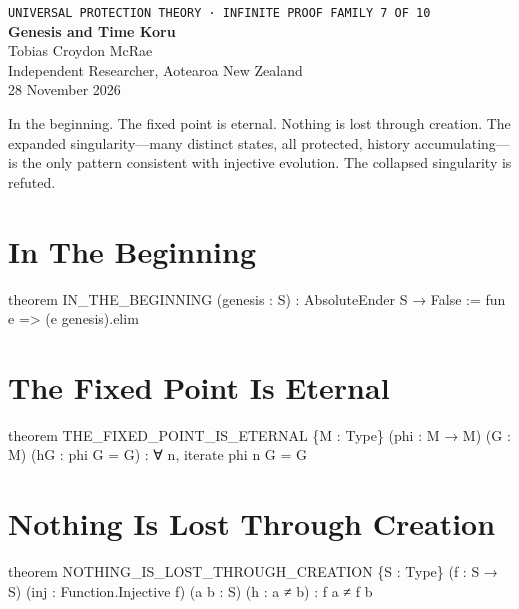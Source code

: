 




\begin{center}
{\small\texttt{UNIVERSAL PROTECTION THEORY · INFINITE PROOF FAMILY 7 OF 10}}\\[1.5em]
{\Huge\bfseries\color{korugreen} Genesis and Time Koru}\\[1em]
{\large Tobias Croydon McRae}\\[0.3em]
{\small Independent Researcher, Aotearoa New Zealand}\\[0.3em]
{\small 28 November 2026}
\end{center}

\bigskip

\noindent In the beginning. The fixed point is eternal. Nothing is lost through creation. The expanded singularity—many distinct states, all protected, history accumulating—is the only pattern consistent with injective evolution. The collapsed singularity is refuted.

\section{In The Beginning}

\begin{leancode}
theorem IN_THE_BEGINNING (genesis : S) :
     AbsoluteEnder S → False :=
     fun e => (e genesis).elim
\end{leancode}

\axiombadge

\section{The Fixed Point Is Eternal}

\begin{leancode}
theorem THE_FIXED_POINT_IS_ETERNAL \{M : Type\}
     (phi : M → M) (G : M) (hG : phi G = G) :
     ∀ n, iterate phi n G = G
\end{leancode}

\axiombadge

\section{Nothing Is Lost Through Creation}

\begin{leancode}
theorem NOTHING_IS_LOST_THROUGH_CREATION \{S : Type\}
     (f : S → S) (inj : Function.Injective f)
     (a b : S) (h : a ≠ b) : f a ≠ f b
\end{leancode}

